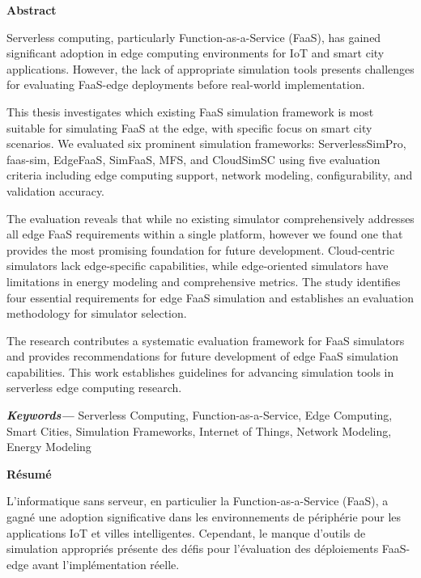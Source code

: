 \vspace*{4cm}
\begin{center}
    {\Large\bf Abstract}
\end{center} \vskip 0.5cm

Serverless computing, particularly Function-as-a-Service (FaaS), has gained significant adoption in edge computing environments for IoT and smart city applications. However, the lack of appropriate simulation tools presents challenges for evaluating FaaS-edge deployments before real-world implementation.

This thesis investigates which existing FaaS simulation framework is most suitable for simulating FaaS at the edge, with specific focus on smart city scenarios. We evaluated six prominent simulation frameworks: ServerlessSimPro, faas-sim, EdgeFaaS, SimFaaS, MFS, and CloudSimSC using five evaluation criteria including edge computing support, network modeling, configurability, and validation accuracy.

The evaluation reveals that while no existing simulator comprehensively addresses all edge FaaS requirements within a single platform, however we found one that provides the most promising foundation for future development. Cloud-centric simulators lack edge-specific capabilities, while edge-oriented simulators have limitations in energy modeling and comprehensive metrics. The study identifies four essential requirements for edge FaaS simulation and establishes an evaluation methodology for simulator selection.

The research contributes a systematic evaluation framework for FaaS simulators and provides recommendations for future development of edge FaaS simulation capabilities. This work establishes guidelines for advancing simulation tools in serverless edge computing research.

\providecommand{\keywords}[1] {
  \small
  \textbf{\textit{Keywords---}} #1
}
\keywords{Serverless Computing, Function-as-a-Service, Edge Computing, Smart Cities, Simulation Frameworks, Internet of Things, Network Modeling, Energy Modeling}

\newpage

\vspace*{4cm}
\begin{center}
    {\Large\bf Résumé}
\end{center} \vskip 0.5cm

L'informatique sans serveur, en particulier la Function-as-a-Service (FaaS), a gagné une adoption significative dans les environnements de périphérie pour les applications IoT et villes intelligentes. Cependant, le manque d'outils de simulation appropriés présente des défis pour l'évaluation des déploiements FaaS-edge avant l'implémentation réelle.

